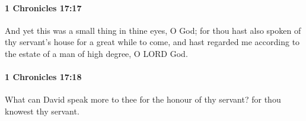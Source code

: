 		\paragraph{1 Chronicles 17:17} %
			\label{1CHRONICLES-17-17}

			And yet this was a small thing in thine eyes, O God; for thou hast also spoken of thy servant’s house for a great while to come, and hast regarded me according to the estate of a man of high degree, O LORD God.


		\paragraph{1 Chronicles 17:18} %
			\label{1CHRONICLES-17-18}

			What can David speak more to thee for the honour of thy servant? for thou knowest thy servant.


